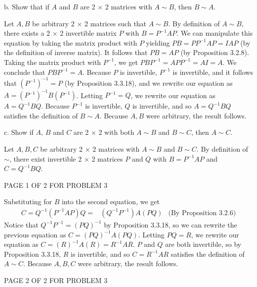 \documentclass[12pt]{article}
\newenvironment{problem}[2][Problem]
{
	\begin{trivlist} 
		\item[\hskip \labelsep {\bfseries #1 #2:}]
	}
{
	\end{trivlist}
	}
\newenvironment{solution}[1][Solution]
{
	\begin{trivlist} 
		\item[\hskip \labelsep {\itshape #1:}]
	}
	{
	\end{trivlist}
}
\begin{document}
\begin{problem}{3}
\begin{solution}
\end{solution}
\noindent
\newline
\newline
b. Show that if $A$ and $B$ are 2 $\times$ 2 matrices with $A\sim B$, then $B\sim A$.
\begin{solution}
Let $A,B$ be arbitrary 2 $\times$ 2 matrices such that $A \sim B$. By definition of $A \sim B$, there exists a  2 $\times$ 2 invertible matrix $P$ with $B=P^{-1}AP$. We can manipulate this equation by taking the matrix product with $P$ yielding $P B = P P^{-1}A P = I A P$ (by the definition of inverse matrix). It follows that $P B = A P$ (by Proposition 3.2.8). Taking the matrix product with $P^{-1}$, we get $P B P^{-1} = A P P^{-1} = A I =A$. We conclude that $P B P^{-1} = A$. Because $P$ is invertible, $P^{-1}$ is invertible, and it follows that $(P^{-1})^{-1} = P$ (by Proposition 3.3.18), and we rewrite our equation as $A = (P^{-1})^{-1} B (P^{-1})$. Letting $P^{-1} = Q$, we rewrite our equation as $A = Q^{-1} B Q$. Because $P^{-1}$ is invertible, $Q$ is invertible, and so $A = Q^{-1} B Q$ satisfies the definition of $B \sim A$. Because $A,B$ were arbitrary, the result follows.
\end{solution}

\noindent
\newline
\newline
c. Show if $A$, $B$ and $C$ are 2 $\times$ 2 with both $A\sim B$ and $B\sim C$, then $A\sim C$.
\begin{solution}
Let $A,B,C$ be arbitrary 2 $\times$ 2 matrices with $A \sim B$ and $B \sim C$. By definition of $\sim$, there exist invertible 2 $\times$ 2 matrices $P$ and $Q$ with $B=P^{-1}AP$ and $C=Q^{-1}BQ$.
\vfill
\centerline{PAGE 1 OF 2 FOR PROBLEM 3}

\newpage
Substituting for $B$ into the second equation, we get
\begin{align*}
C=Q^{-1}(P^{-1}AP)Q = &(Q^{-1} P^{-1}) A (P Q) &\text{(By Proposition 3.2.6)}
\end{align*}
Notice that $Q^{-1} P^{-1} = (PQ)^{-1}$ by Proposition 3.3.18, so we can rewrite the previous equation as $C= (PQ)^{-1} A (P Q)$. Letting $PQ =R$, we rewrite our equation as $C = (R)^{-1} A (R) = R^{-1} A R$. $P$ and $Q$ are both invertible, so by Proposition 3.3.18, $R$ is invertible, and so $C=R^{-1} A R$ satisfies the definition of $A \sim C$. Because $A,B,C$ were arbitrary, the result follows.
\end{solution}
\vfill
\centerline{PAGE 2 OF 2 FOR PROBLEM 3}
\end{problem}
\end{document}
